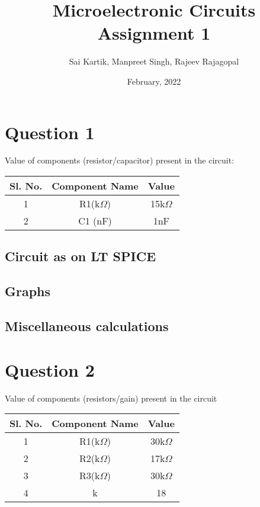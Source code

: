 \documentclass{article}[12pt]
\title{Microelectronic Circuits Assignment 1}
\author{Sai Kartik, Manpreet Singh, Rajeev Rajagopal}
\date{February, 2022}
\begin{document}
\maketitle
\section*{Question 1}
Value of components (resistor/capacitor) present in the circuit:
\begin{center}
    \begin{tabular}{|c | c | c|}
        \hline
        Sl. No. & Component Name & Value       \\
        \hline
        1       & R1(k$\Omega$)  & 15k$\Omega$ \\ %
        2       & C1 (nF)        & 1nF         \\ %
        \hline
    \end{tabular}
\end{center}
\subsection*{Circuit as on LT SPICE}
\subsection*{Graphs}
\subsection*{Miscellaneous calculations}
\newpage
\section*{Question 2}
Value of components (resistors/gain) present in the circuit
\begin{center}
    \begin{tabular}{|c | c | c|}
        \hline
        Sl. No. & Component Name & Value       \\
        \hline
        1       & R1(k$\Omega$)  & 30k$\Omega$ \\ %
        2       & R2(k$\Omega$)  & 17k$\Omega$ \\ %
        3       & R3(k$\Omega$)  & 30k$\Omega$ \\ %
        4       & k              & 18          \\ %
        \hline
    \end{tabular}
\end{center}
\end{document}
